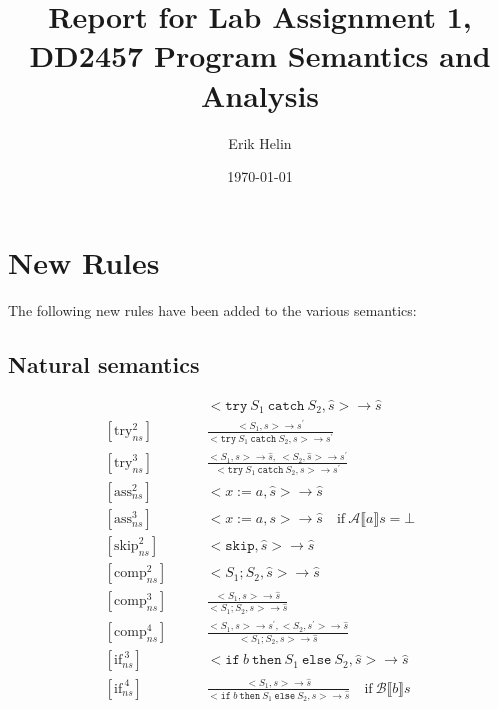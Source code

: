 \documentclass[11pt,oneside,a4paper]{article}
\begin{document}
\title{Report for Lab Assignment 1, DD2457 Program Semantics and Analysis}
\author{Erik Helin}
\date{\today}
\maketitle

\section*{New Rules}
The following new rules have been added to the various semantics:
\subsection*{Natural semantics}
\begingroup
\addtolength{\jot}{.5em}
\begin{align*}
[\text{try}_{ns}^1] \quad \quad &
<\texttt{try}\: S_1 \: \texttt{catch}\: S_2, \hat{s}> \rightarrow \hat{s} \\
[\text{try}_{ns}^2] \quad \quad &
\frac{<S_1,s> \rightarrow s^{'}}
     {<\texttt{try}\: S_1 \: \texttt{catch} \: S_2, s> \rightarrow s^{'}}  \\
[\text{try}_{ns}^3] \quad \quad &
\frac{<S_1,s> \rightarrow \hat{s}, \: <S_2, \hat{s}> \rightarrow s^{'}}
     {<\texttt{try}\: S_1 \: \texttt{catch} \: S_2, s> \rightarrow s^{'}} \\
[\text{ass}_{ns}^2] \quad \quad &
<x := a, \hat{s}> \rightarrow \hat{s} \\
[\text{ass}_{ns}^3] \quad \quad &
<x := a, s> \rightarrow \hat{s} \quad 
\text{if} \: \mathcal{A} \llbracket a \rrbracket s = \bot \\
[\text{skip}_{ns}^2] \quad \quad &
<\texttt{skip}, \hat{s}> \rightarrow \hat{s} \\
[\text{comp}_{ns}^2] \quad \quad &
<S_1;S_2, \hat{s}> \rightarrow \hat{s} \\
[\text{comp}_{ns}^3] \quad \quad &
\frac{<S_1, s> \rightarrow \hat{s}}{<S_1;S_2, s> \rightarrow \hat{s}} \\
[\text{comp}_{ns}^4] \quad \quad &
\frac{<S_1, s> \rightarrow s^{'}, <S_2, s^{'}> \rightarrow \hat{s}}
{<S_1;S_2, s> \rightarrow \hat{s}} \\
[\text{if}_{ns}^{\:3}] \quad \quad & <\texttt{if}\:b\: \texttt{then}\:  S_1 \: 
\texttt{else} \: S_2, \hat{s}> \rightarrow \hat{s} \\
[\text{if}_{ns}^{\:4}] \quad \quad & \frac{<S_1, s> \rightarrow \hat{s}}
{ <\texttt{if}\:b\: \texttt{then}\:  S_1 \: \texttt{else} \: S_2, s> 
\rightarrow \hat{s}} \quad \text{if} \: \mathcal{B} \llbracket b \rrbracket s

\end{align*}
\end{document}
